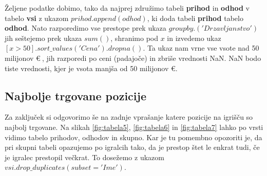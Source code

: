 \documentclass[a4paper, 12pt]{article}
\begin{document}
Željene podatke dobimo, tako da najprej združimo tabeli \textbf{prihod} in \textbf{odhod} v tabelo \textbf{vsi} z ukazom $prihod.append(odhod)$, ki doda tabeli \textbf{prihod} tabelo \textbf{odhod}. 
Nato razporedimo vse prestope prek ukaza $groupby.('Drzavljanstvo')$ jih seštejemo prek ukaza $sum()$, shranimo pod $x$ in izvedemo ukaz $[x>50].sort\_values('Cena').dropna()$. 
Ta ukaz nam vrne vse vsote nad 50 milijonov \euro $\:$, jih razporedi po ceni (padajoče) in zbriše vrednosti NaN. NaN bodo tiste vrednosti, kjer je vsota manjša od 50 milijonov \euro.

\subsection{Najbolje trgovane pozicije}
Za zaključek si odgovorimo še na zadnje vprašanje katere pozicije na igrišču so najbolj trgovane. Na slikah \ref{fig:tabela5}, \ref{fig:tabela6} in \ref{fig:tabela7} lahko po vrsti vidimo tabelo prihodov, odhodov in skupno. Kar je tu pomembno opozoriti je, da pri skupni tabeli opazujemo po igralcih tako, da je prestop štet le enkrat tudi, če je igralec prestopil večkrat. To dosežemo z ukazom $vsi.drop\_duplicates(subset='Ime')$.\\
\end{document}
